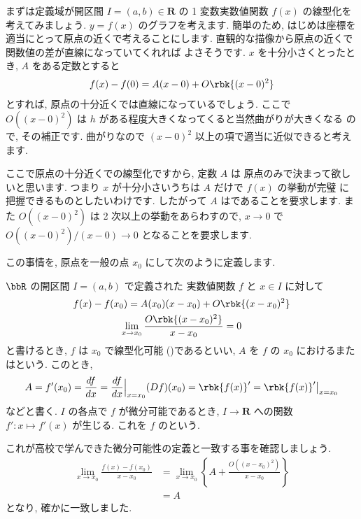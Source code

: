 \documentclass[openany, a4paper, oneside]{jsbook}
\begin{document}
まずは定義域が開区間 $I =(a,b) \in \bm{R}$ の 1 変数実数値関数
$f (x)$ の線型化を考えてみましょう.
$y=f (x)$ のグラフを考えます.
簡単のため, はじめは座標を適当にとって原点の近くで考えることにします.
直観的な描像から原点の近くで関数値の差が直線になっていてくれれば
よさそうです.  $x$ を十分小さくとったとき,  $A$ をある定数とすると
\begin{align}
 f (x) - f (0)
 =
 A (x-0) + O \rbk{(x-0)^2}
\end{align}
とすれば, 原点の十分近くでは直線になっているでしょう.
ここで $O\left ( (x-0)^2 \right)$ は $h$ がある程度大きくなってくると当然曲がりが大きくなる
ので, その補正です. 曲がりなので $(x-0)^2$ 以上の項で適当に近似できると考えます.

ここで原点の十分近くでの線型化ですから, 定数 $A$ は
原点のみで決まって欲しいと思います.
つまり $x$ が十分小さいうちは $A$ だけで $f (x)$ の挙動が完璧
に把握できるものとしたいわけです.
したがって $A$ はであることを要求します.
また $O\left ( (x-0)^2 \right)$ は 2 次以上の挙動をあらわすので,  $x \rightarrow 0$ で
$O\left ( (x-0)^2 \right) / (x-0) \rightarrow 0$ となることを要求します.

この事情を, 原点を一般の点 $x_0$ にして次のように定義します.
\begin{defn} $\bbR$ の開区間 $I=(a,b)$ で定義された
実数値関数 $f$ と $x \in I$ に対して
\begin{gather}
 f (x) - f (x_0)
 =
 A (x_0) (x-x_0) + O \rbk{(x-x_0)^2} \\
 \lim_{x \to x_0}
 \frac{O \rbk{(x-x_0)^2}}{x-x_0}
 =
 0
\end{gather}
と書けるとき,  $f$ は $x_0$ で線型化可能 ()であるといい,
$A$ を $f$ の $x_0$ におけるまたはという.
このとき,
\begin{align}
 A
 =
 f'(x_0)
 =
 \frac{df}{dx}
 =
 \frac{df}{dx} \Big|_{x=x_0}
 (Df) (x_0)
 =
 \rbk{f(x)}'
 =
 \rbk{f (x)}' \big|_{x=x_0}
\end{align}
などと書く.
$I$ の各点で $f$ が微分可能であるとき,  $I \to \bm{R}$ への関数
$f':x \mapsto f'(x)$ が生じる. これを $f$ のという.
\end{defn}

これが高校で学んできた微分可能性の定義と一致する事を確認しましょう.
\begin{align}
    \lim_{x \to x_0}\frac{ f (x) - f (x_0) }{x-x_0} &=\lim_{x \to x_0}
    \left \{ A + \frac{O\left ( (x-x_0)^2 \right) }{x-x_0} \right \}\\
        &=A
\end{align}
となり, 確かに一致しました.
\end{document}
